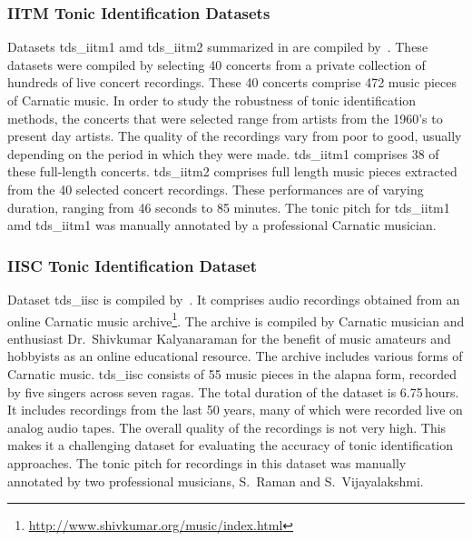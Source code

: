 {\subsubsection{IITM Tonic Identification Datasets}
\label{sec:corpus_iitm_tonic_datasets}

Datasets \acrshort{tds_iitm1} amd \acrshort{tds_iitm2} summarized in  are compiled by~\cite{bellur2012knowledge}. These datasets were compiled by selecting 40 concerts from a private collection of hundreds of live concert recordings. These 40 concerts comprise 472 music pieces of Carnatic music. In order to study the robustness of tonic identification methods, the concerts that were selected range from artists from the 1960's to present day artists. The quality of the recordings vary from poor to good, usually depending on the period in which they were made. \acrshort{tds_iitm1} comprises 38 of these full-length concerts. \acrshort{tds_iitm2} comprises full length music pieces extracted from the 40 selected concert recordings. These performances are of varying duration, ranging from 46 seconds to 85 minutes. The tonic pitch for \acrshort{tds_iitm1} amd \acrshort{tds_iitm1} was manually annotated by a professional Carnatic musician.


\subsubsection{IISC Tonic Identification Dataset}
\label{sec:corpus_iisc_tonic_dataset}

Dataset \acrshort{tds_iisc} is compiled by~\cite{ranjani2011carnatic}. It comprises audio recordings obtained from an online Carnatic music archive\footnote{\url{http://www.shivkumar.org/music/index.html}}. The archive is compiled by Carnatic musician and enthusiast Dr.~Shivkumar Kalyanaraman for the benefit of music amateurs and hobbyists as an online educational resource. The archive includes various forms of Carnatic music. \acrshort{tds_iisc} consists of 55 music pieces in the \gls{alapna} form, recorded by five singers across seven \glspl{raga}. The total duration of the dataset is 6.75\,hours. It includes recordings from the last 50 years, many of which were recorded live on analog audio tapes. The overall quality of the recordings is not very high. This makes it a challenging dataset for evaluating the accuracy of tonic identification approaches. The tonic pitch for recordings in this dataset was manually annotated by two professional musicians, S.~Raman and S.~Vijayalakshmi.


}

